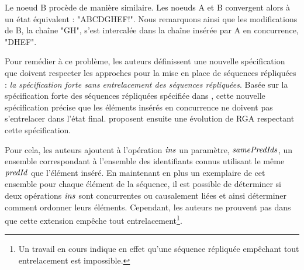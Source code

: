 Le noeud B procède de manière similaire.
Les noeuds A et B convergent alors à un état équivalent : "ABCDGHEF!".
Nous remarquons ainsi que les modifications de B, la chaîne "GH", s'est intercalée dans la chaîne insérée par A en concurrence, "DHEF".

Pour remédier à ce problème, les auteurs définissent une nouvelle spécification que doivent respecter les approches pour la mise en place de séquences répliquées : \emph{la spécification forte sans entrelacement des séquences répliquées}.
Basée sur la spécification forte des séquences répliquées spécifiée dans \cite{2016-specification-complexity-collaborative-text-editing-attiya, 2021-specification-complexity-collaborative-text-editing-attiya}, cette nouvelle spécification précise que les éléments insérés en concurrence ne doivent pas s'entrelacer dans l'état final.
\textcite{2019-interleaving-anomalies-collaborative-editors-kleppmann} proposent ensuite une évolution de \ac{RGA} respectant cette spécification.

Pour cela, les auteurs ajoutent à l'opération $\mathit{ins}$ un paramètre, $\mathit{samePredIds}$, un ensemble correspondant à l'ensemble des identifiants connus utilisant le même $\mathit{predId}$ que l'élément inséré.
En maintenant en plus un exemplaire de cet ensemble pour chaque élément de la séquence, il est possible de déterminer si deux opérations $\mathit{ins}$ sont concurrentes ou causalement liées et ainsi déterminer comment ordonner leurs éléments.
Cependant, les auteurs ne prouvent pas dans \cite{2019-interleaving-anomalies-collaborative-editors-kleppmann} que cette extension empêche tout entrelacement\footnote{Un travail en cours \cite{2022-no-doubly-non-interleaving-crdts-weidner} indique en effet qu'une séquence répliquée empêchant tout entrelacement est impossible.}.
